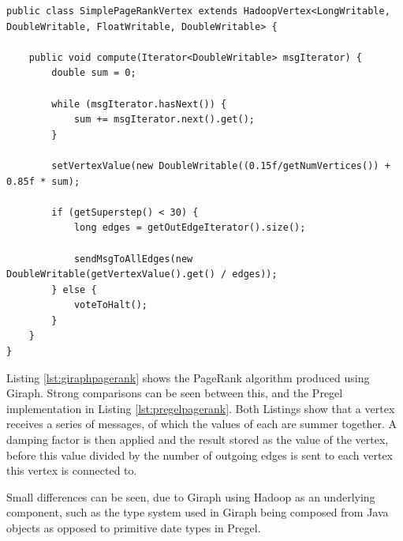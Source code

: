 \begin{lstlisting}[float]
public class SimplePageRankVertex extends HadoopVertex<LongWritable, DoubleWritable, FloatWritable, DoubleWritable> {

	public void compute(Iterator<DoubleWritable> msgIterator) {
		double sum = 0;
		
		while (msgIterator.hasNext()) {
			sum += msgIterator.next().get();
		}
		
		setVertexValue(new DoubleWritable((0.15f/getNumVertices()) + 0.85f * sum);
		
		if (getSuperstep() < 30) {
			long edges = getOutEdgeIterator().size();
			
			sendMsgToAllEdges(new DoubleWritable(getVertexValue().get() / edges));
		} else {
			voteToHalt();
		}
	}
}					
\end{lstlisting}

Listing \ref{lst:giraphpagerank} shows the PageRank algorithm \cite{pagerank} produced using Giraph. Strong comparisons can be seen between this, and the Pregel implementation in Listing \ref{lst:pregelpagerank}. Both Listings show that a vertex receives a series of messages, of which the values of each are summer together. A damping factor is then applied and the result stored as the value of the vertex, before this value divided by the number of outgoing edges is sent to each vertex this vertex is connected to.

Small differences can be seen, due to Giraph using Hadoop as an underlying component, such as the type system used in Giraph being composed from Java objects as opposed to primitive date types in Pregel.
